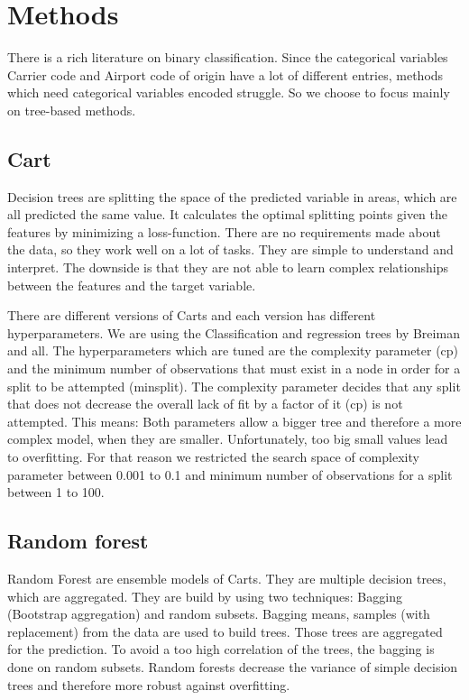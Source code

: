 \documentclass{article}
\begin{document}
\section{Methods}
There is a rich literature on binary classification. Since the categorical variables Carrier code and Airport code of origin have a lot of different entries, methods which need categorical variables encoded struggle. So we choose to focus mainly on tree-based methods. 

\subsection{Cart}
Decision trees are splitting the space of the predicted variable in areas, which are all predicted the same value. It calculates the optimal splitting points given the features by minimizing a loss-function. There are no requirements made about the data, so they work well on a lot of tasks. They are simple to understand and interpret. The downside is that they are not able to learn complex relationships between the features and the target variable.

There are different versions of Carts and each version has different hyperparameters. We are using the Classification and regression trees by Breiman and all\cite{rpart}. The hyperparameters which are tuned are the complexity parameter (cp) and 	the minimum number of observations that must exist in a node in order for a split to be attempted (minsplit). The complexity parameter decides that any split that does not decrease the overall lack of fit by a factor of it (cp) is not attempted. This means: Both parameters allow a bigger tree and therefore a more complex model, when they are smaller. Unfortunately, too big small values lead to overfitting. For that reason we restricted the search space of complexity parameter between 0.001 to 0.1 and minimum number of observations for a split between 1 to 100.

\subsection{Random forest}
Random Forest are ensemble models of Carts. They are multiple decision trees, which are aggregated. They are build by using two techniques: Bagging (Bootstrap aggregation) and random subsets. Bagging means, samples (with replacement) from the data are used to build trees. Those trees are aggregated for the prediction. To avoid a too high correlation of the trees, the bagging is done on random subsets. Random forests decrease the variance of simple decision trees and therefore more robust against overfitting.
\end{document}
